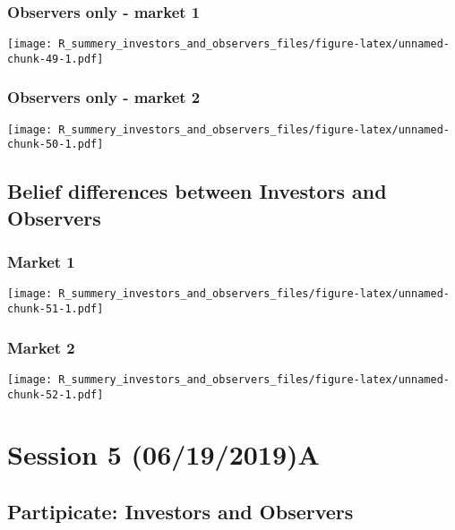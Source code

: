 \documentclass[]{article}
\begin{document}
\hypertarget{observers-only---market-1-3}{%
\subsubsection{Observers only - market
1}\label{observers-only---market-1-3}}

\texttt{[image: R\_summery\_investors\_and\_observers\_files/figure-latex/unnamed-chunk-49-1.pdf]}

\hypertarget{observers-only---market-2-3}{%
\subsubsection{Observers only - market
2}\label{observers-only---market-2-3}}

\texttt{[image: R\_summery\_investors\_and\_observers\_files/figure-latex/unnamed-chunk-50-1.pdf]}

\hypertarget{belief-differences-between-investors-and-observers-3}{%
\subsection{Belief differences between Investors and
Observers}\label{belief-differences-between-investors-and-observers-3}}

\hypertarget{market-1-3}{%
\subsubsection{Market 1}\label{market-1-3}}

\texttt{[image: R\_summery\_investors\_and\_observers\_files/figure-latex/unnamed-chunk-51-1.pdf]}

\hypertarget{market-2-3}{%
\subsubsection{Market 2}\label{market-2-3}}

\texttt{[image: R\_summery\_investors\_and\_observers\_files/figure-latex/unnamed-chunk-52-1.pdf]}

\hypertarget{session-5-06192019a}{%
\section{Session 5 (06/19/2019)A}\label{session-5-06192019a}}

\hypertarget{partipicate-investors-and-observers-4}{%
\subsection{Partipicate: Investors and
Observers}\label{partipicate-investors-and-observers-4}}
\end{document}

